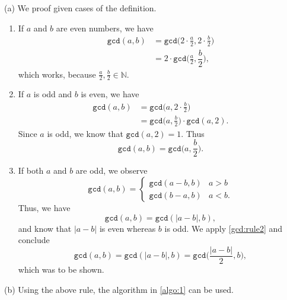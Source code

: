 \documentclass[12pt]{article}
\begin{document}
 


  (a) We proof given cases of the definition. \begin{enumerate}
 	\item If $a$ and $b$ are even numbers, we have \begin{align}
 		\texttt{gcd}(a,b) &= \texttt{gcd}\bigg(2\cdot\frac{a}{2},2\cdot\frac{b}{2}\bigg) \\
 		&=2\cdot\texttt{gcd}\bigg(\frac{a}{2},\dfrac{b}{2}\bigg),
 	\end{align} which works, because $\frac{a}{2},\frac{b}{2}\in\mathbb{N}$.
 	\item If $a$ is odd and $b$ is even, we have \begin{align}
 		\texttt{gcd}(a,b)&=\texttt{gcd}\bigg(a,2\cdot\frac{b}{2}\bigg) \\
 		&=\texttt{gcd}\bigg(a,\frac{b}{2}\bigg)\cdot\texttt{gcd}(a,2).
 	\end{align} Since $a$ is odd, we know that $\texttt{gcd}(a,2)=1$. Thus \begin{equation}
 		\label{gcd:rule2}\texttt{gcd}(a,b)=\texttt{gcd}\bigg(a,\frac{b}{2}\bigg).
 	\end{equation}
 	\item If both $a$ and $b$ are odd, we observe \begin{equation}
 		\texttt{gcd}(a,b)=\begin{cases}
 			\texttt{gcd}(a-b,b) & a > b \\
 			\texttt{gcd}(b-a,b) & a < b.
 		\end{cases}
 	\end{equation} Thus, we have \begin{equation}
 		\texttt{gcd}(a,b)=\texttt{gcd}(|a-b|, b),
 	\end{equation} and know that $|a-b|$ is even whereas $b$ is odd. We apply \autoref{gcd:rule2} and conclude \begin{equation}
 		\texttt{gcd}(a,b)=\texttt{gcd}(|a-b|,b)=\texttt{gcd}\bigg(\dfrac{|a-b|}{2},b\bigg),
 	\end{equation} which was to be shown.
 \end{enumerate}

 (b) Using the above rule, the algorithm in \autoref{algo:1} can be used.
 
\end{document}
